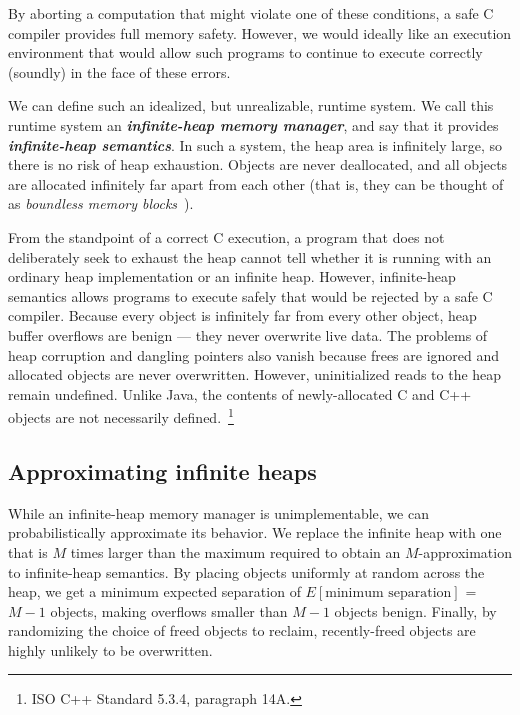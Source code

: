 \documentclass{sig-alternate}
\begin{document}


By aborting a computation that might violate one of these conditions,
a safe C compiler provides full memory safety. However, we would
ideally like an execution environment that would allow such programs
to continue to execute correctly (soundly) in the face of these
errors.

We can define such an idealized, but unrealizable, runtime system. We
call this runtime system an
\emph{\bf infinite-heap memory manager}, and say that it provides
\emph{\bf infinite-heap semantics}. In such a system, the heap area is
infinitely large, so there is no risk of heap exhaustion. Objects are
never deallocated, and all objects are allocated infinitely far apart
from each other (that is, they can be thought of as \emph{boundless
memory blocks}~\cite{rinard04dynamic}).

From the standpoint of a correct C execution, a program that does not
deliberately seek to exhaust the heap cannot tell whether it is
running with an ordinary heap implementation or an infinite
heap. However, infinite-heap semantics allows programs to execute
safely that would be rejected by a safe C compiler. Because every
object is infinitely far from every other object, heap buffer
overflows are benign --- they never overwrite live data. The problems
of heap corruption and dangling pointers also vanish because frees are
ignored and allocated objects are never overwritten. However,
uninitialized reads to the heap remain undefined. Unlike Java, the
contents of newly-allocated C and C++ objects are not necessarily
defined.~\footnote{ISO C++ Standard 5.3.4, paragraph 14A.}

\subsection{Approximating infinite heaps}

\noindent
While an infinite-heap memory manager is unimplementable, we can
probabilistically approximate its behavior. We replace the infinite
heap with one that is $M$ times larger than the maximum required to
obtain an $M$-approximation to infinite-heap semantics. By placing
objects uniformly at random across the heap, we get a minimum expected
separation of $E[\mbox{minimum separation}]$ = $M-1$ objects, making
overflows smaller than $M-1$ objects benign. Finally, by randomizing
the choice of freed objects to reclaim, recently-freed objects are
highly unlikely to be overwritten.
\end{document}
